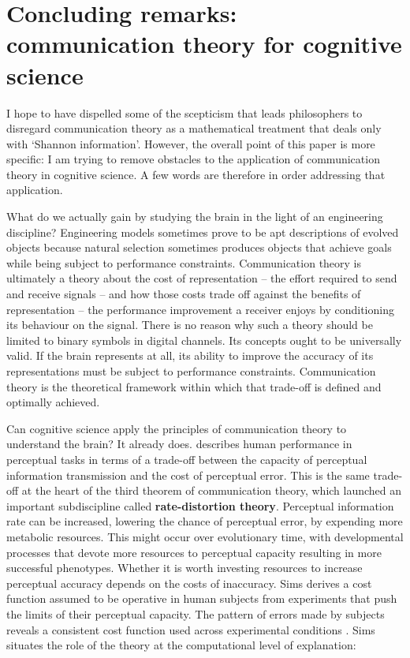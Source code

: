 \section{Concluding remarks: communication theory for cognitive science}\label{sec:conclusion}

I hope to have dispelled some of the scepticism that leads philosophers to disregard communication theory as a mathematical treatment that deals only with `Shannon information'.
However, the overall point of this paper is more specific: I am trying to remove obstacles to the application of communication theory in cognitive science.
A few words are therefore in order addressing that application.

What do we actually gain by studying the brain in the light of an engineering discipline?
Engineering models sometimes prove to be apt descriptions of evolved objects because natural selection sometimes produces objects that achieve goals while being subject to performance constraints.
Communication theory is ultimately a theory about the cost of representation -- the effort required to send and receive signals -- and how those costs trade off against the benefits of representation -- the performance improvement a receiver enjoys by conditioning its behaviour on the signal.
There is no reason why such a theory should be limited to binary symbols in digital channels.
Its concepts ought to be universally valid.
If the brain represents at all, its ability to improve the accuracy of its representations must be subject to performance constraints.
Communication theory is the theoretical framework within which that trade-off is defined and optimally achieved.

Can cognitive science apply the principles of communication theory to understand the brain?
It already does.
\citet{sims2016ratedistortion} describes human performance in perceptual tasks in terms of a trade-off between the capacity of perceptual information transmission and the cost of perceptual error.
This is the same trade-off at the heart of the third theorem of communication theory, which launched an important subdiscipline called \textbf{rate-distortion theory}.
Perceptual information rate can be increased, lowering the chance of perceptual error, by expending more metabolic resources.
This might occur over evolutionary time, with developmental processes that devote more resources to perceptual capacity resulting in more successful phenotypes.
Whether it is worth investing resources to increase perceptual accuracy depends on the costs of inaccuracy.
Sims derives a cost function assumed to be operative in human subjects from experiments that push the limits of their perceptual capacity.
The pattern of errors made by subjects reveals a consistent cost function used across experimental conditions \citep[188]{sims2016ratedistortion}.
Sims situates the role of the theory at the computational level of explanation:

